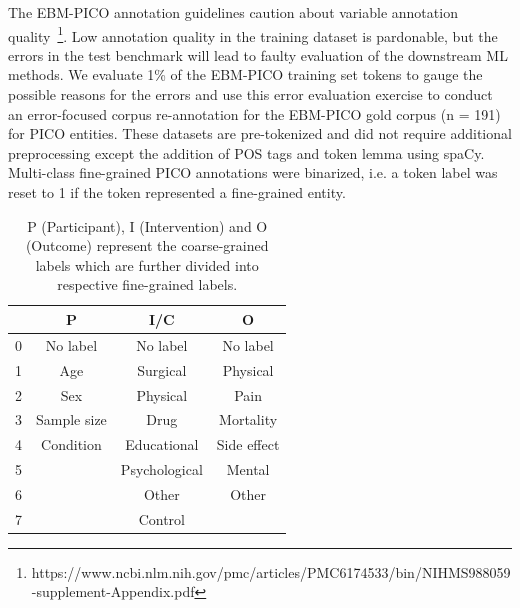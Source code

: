 \documentclass[10.7pt,]{article}
\begin{document}
The EBM-PICO annotation guidelines caution about variable annotation quality~\footnote{https://www.ncbi.nlm.nih.gov/pmc/articles/PMC6174533/bin/NIHMS988059-supplement-Appendix.pdf}.
Low annotation quality in the training dataset is pardonable, but the errors in the test benchmark will lead to faulty evaluation of the downstream ML methods.
We evaluate 1\% of the EBM-PICO training set tokens to gauge the possible reasons for the errors and use this error evaluation exercise to conduct an error-focused corpus re-annotation for the EBM-PICO gold corpus (n = 191) for PICO entities.
These datasets are pre-tokenized and did not require additional preprocessing except the addition of POS tags and token lemma using spaCy.
Multi-class fine-grained PICO annotations were binarized, i.e. a token label was reset to 1 if the token represented a fine-grained entity.
%
%
%
\begin{table}[h!]
\begin{center}
\begin{tabular}{| c | c | c | c |} 
\hline
 & P & I/C & O \\ 
\hline
0 & No label & No label & No label \\ 
1 & Age & Surgical & Physical \\ 
2 & Sex & Physical & Pain \\
3 & Sample size & Drug & Mortality \\
4 & Condition & Educational & Side effect \\
5 &  & Psychological & Mental \\
6 &  & Other & Other \\
7 &  & Control &  \\
\hline
\end{tabular}
\caption{\label{tab:coarsefineconcept} P (Participant), I (Intervention) and O (Outcome) represent the coarse-grained labels which are further divided into respective fine-grained labels.}
\end{center}
\end{table}
%
%
%
\end{document}
